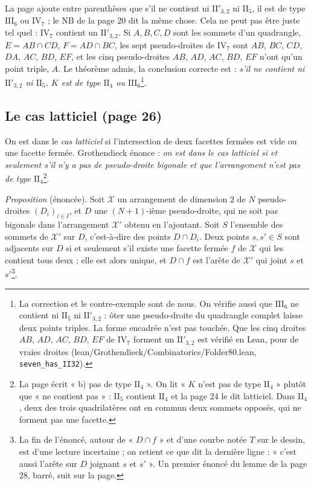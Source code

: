 \documentclass[11pt,a4paper]{article}
\begin{document}
La page ajoute entre parenthèses que s'il ne contient ni $\mathrm{II}'_{3,2}$
ni $\mathrm{II}_5$, il est de type $\mathrm{III}_6$ ou $\mathrm{IV}_7$ ; le NB
de la page 20 dit la même chose. Cela ne peut pas être juste tel quel :
$\mathrm{IV}_7$ contient un $\mathrm{II}'_{3,2}$. Si $A, B, C, D$ sont les
sommets d'un quadrangle, $E = AB \cap CD$, $F = AD \cap BC$, les sept
pseudo-droites de $\mathrm{IV}_7$ sont $AB$, $BC$, $CD$, $DA$, $AC$, $BD$,
$EF$, et les cinq pseudo-droites $AB$, $AD$, $AC$, $BD$, $EF$ n'ont qu'un
point triple, $A$. Le théorème admis, la conclusion correcte est : \emph{s'il
ne contient ni $\mathrm{II}'_{3,2}$ ni $\mathrm{II}_5$, $K$ est de type
$\mathrm{II}_4$ ou $\mathrm{III}_6$}\footnote{La correction et le
contre-exemple sont de nous. On vérifie aussi que $\mathrm{III}_6$ ne
contient ni $\mathrm{II}_5$ ni $\mathrm{II}'_{3,2}$ : ôter une pseudo-droite
du quadrangle complet laisse deux points triples. La forme encadrée n'est pas
touchée. Que les cinq droites $AB$, $AD$, $AC$, $BD$, $EF$ de
$\mathrm{IV}_7$ forment un $\mathrm{II}'_{3,2}$ est vérifié en Lean, pour de
vraies droites (lean/Grothendieck/Combinatorics/Folder80.lean,
\texttt{seven\_has\_II32}).}.

\subsection*{Le cas latticiel (page 26)}

On est dans le \emph{cas latticiel} si l'intersection de deux facettes
fermées est vide ou une facette fermée. Grothendieck énonce : \emph{on est
dans le cas latticiel si et seulement s'il n'y a pas de pseudo-droite
bigonale et que l'arrangement n'est pas de type $\mathrm{II}_4$}\footnote{La
page écrit « b) pas de type $\mathrm{II}_4$ ». On lit « $K$ n'est pas de type
$\mathrm{II}_4$ » plutôt que « ne contient pas » : $\mathrm{II}_5$ contient
$\mathrm{II}_4$ et la page 24 le dit latticiel. Dans $\mathrm{II}_4$, deux
des trois quadrilatères ont en commun deux sommets opposés, qui ne forment
pas une facette.}.

\emph{Proposition} (énoncée). Soit $\mathcal{X}$ un arrangement de dimension
$2$ de $N$ pseudo-droites $(D_i)_{i \in I}$, et $D$ une $(N+1)$-ième
pseudo-droite, qui ne soit pas bigonale dans l'arrangement $\mathcal{X}'$
obtenu en l'ajoutant. Soit $S$ l'ensemble des sommets de $\mathcal{X}'$ sur
$D$, c'est-à-dire des points $D \cap D_i$. Deux points $s, s' \in S$ sont
adjacents sur $D$ si et seulement s'il existe une facette fermée $f$ de
$\mathcal{X}$ qui les contient tous deux ; elle est alors unique, et $D \cap
f$ est l'arête de $\mathcal{X}'$ qui joint $s$ et $s'$\footnote{La fin de
l'énoncé, autour de « $D \cap f$ » et d'une courbe notée $T$ sur le dessin,
est d'une lecture incertaine ; on retient ce que dit la dernière ligne :
« c'est aussi l'arête sur $D$ joignant $s$ et $s'$ ». Un premier énoncé du
lemme de la page 28, barré, suit sur la page.}.
\end{document}
